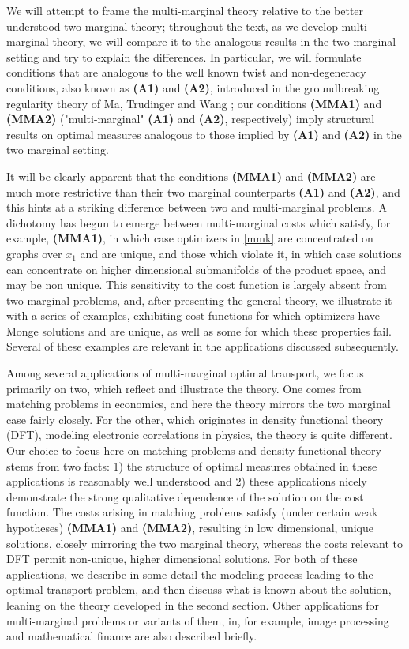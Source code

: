 \documentclass[letter,10pt]{article}
\theoremstyle{dotless}
\begin{document}
We will attempt to frame the multi-marginal theory relative to the better understood two marginal theory; throughout the text, as we develop multi-marginal theory, we will compare it to the analogous results in the two marginal setting and try to explain the differences.  In particular, we will formulate conditions that are analogous to the well known twist and non-degeneracy conditions, also known as \textbf{(A1)} and \textbf{(A2)}, introduced in the groundbreaking regularity theory of Ma, Trudinger and Wang \cite{mtw}; our conditions \textbf{(MMA1)} and \textbf{(MMA2)} ("multi-marginal" \textbf{(A1)} and \textbf{(A2)},  respectively)  imply structural results on optimal measures analogous to those implied by \textbf{(A1)} and \textbf{(A2)} in the two marginal setting.  

It will be clearly apparent that the conditions \textbf{(MMA1)} and \textbf{(MMA2)} are much more restrictive than their two marginal counterparts \textbf{(A1)} and \textbf{(A2)}, and this hints at a striking difference between two and multi-marginal problems.  A dichotomy has begun to emerge between multi-marginal costs which satisfy, for example, \textbf{(MMA1)}, in which case optimizers in \eqref{mmk} are concentrated on graphs over $x_1$ and are unique, and those which violate it, in which case solutions can concentrate on higher dimensional  submanifolds of the product space, and may be non unique.  This sensitivity to the cost function is largely absent from two marginal problems, and, after presenting the general theory, we illustrate it with a series of examples, exhibiting cost functions for which optimizers have Monge solutions and are unique, as well as some for which these properties fail.  Several of these examples are relevant in the applications discussed subsequently.

Among several  applications of multi-marginal optimal transport, we focus primarily on two, which reflect and illustrate the theory.  One comes from matching problems in economics, and here the theory mirrors the two marginal case fairly closely.  For the other, which originates in density functional theory (DFT), modeling electronic correlations in physics, the theory is quite different.    Our choice to focus here on matching problems and density functional theory stems from two facts: 1) the structure of optimal measures obtained in these applications is reasonably well understood and 2) these applications nicely demonstrate the strong qualitative dependence of the solution on the cost function.  The costs arising in matching problems satisfy (under certain weak hypotheses) \textbf{(MMA1)} and \textbf{(MMA2)}, resulting in low dimensional, unique solutions, closely mirroring the two marginal theory, whereas the costs relevant to DFT permit non-unique, higher dimensional solutions.   For both of these applications, we describe in some detail the modeling process leading to the optimal transport problem, and then discuss what is known about the solution, leaning on the theory developed in the second section.  Other applications for multi-marginal problems or variants of them, in, for example, image processing and mathematical finance are also described briefly.
\end{document}
